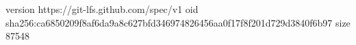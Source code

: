 version https://git-lfs.github.com/spec/v1
oid sha256:ca6850209f8af6da9a8c627bfd346974826456aa0f17f8f201d729d3840f6b97
size 87548

